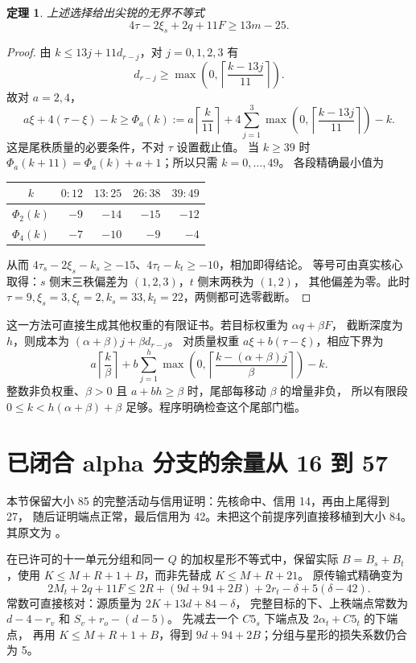 \documentclass[11pt,a4paper]{article}
\newtheorem{theorem}{定理}[section]
\begin{document}
\begin{theorem}\label{thm:weighted}
上述选择给出尖锐的无界不等式
\[\boxed{4\tau-2\xi_s+2q+11F\ge13m-25.}\]
\end{theorem}
\begin{proof}
由 $k\le13j+11d_{r-j}$，对 $j=0,1,2,3$ 有
\[d_{r-j}\ge\max\left(0,\left\lceil\frac{k-13j}{11}\right\rceil\right).
\]
故对 $a=2,4$，
\[
a\xi+4(\tau-\xi)-k\ge
\Phi_a(k):=a\left\lceil\frac{k}{11}\right\rceil+
4\sum_{j=1}^3\max\left(0,\left\lceil\frac{k-13j}{11}\right\rceil\right)-k.
\]
这是尾秩质量的必要条件，不对 $\tau$ 设置截止值。
当 $k\ge39$ 时 $\Phi_a(k+11)=\Phi_a(k)+a+1$；所以只需 $k=0,\ldots,49$。
各段精确最小值为
\begin{center}
\begin{tabular}{c|rrrr}
\toprule $k$&$0{:}12$&$13{:}25$&$26{:}38$&$39{:}49$\\\midrule
$\Phi_2(k)$&$-9$&$-14$&$-15$&$-12$\\
$\Phi_4(k)$&$-7$&$-10$&$-9$&$-4$\\\bottomrule
\end{tabular}
\end{center}
从而 $4\tau_s-2\xi_s-k_s\ge-15$、$4\tau_t-k_t\ge-10$，相加即得结论。
等号可由真实核心取得：$s$ 侧末三秩偏差为 $(1,2,3)$，$t$ 侧末两秩为 $(1,2)$，
其他偏差为零。此时 $\tau=9,\xi_s=3,\xi_t=2,k_s=33,k_t=22$，两侧都可选零截断。
\end{proof}

这一方法可直接生成其他权重的有限证书。若目标权重为 $\alpha q+\beta F$，
截断深度为 $h$，则成本为 $(\alpha+\beta)j+\beta d_{r-j}$。
对质量权重 $a\xi+b(\tau-\xi)$，相应下界为
\[
a\left\lceil\frac{k}{\beta}\right\rceil+
b\sum_{j=1}^h\max\left(0,\left\lceil\frac{k-(\alpha+\beta)j}{\beta}\right\rceil\right)-k.
\]
整数非负权重、$\beta>0$ 且 $a+bh\ge\beta$ 时，尾部每移动 $\beta$ 的增量非负，
所以有限段 $0\le k<h(\alpha+\beta)+\beta$ 足够。程序明确检查这个尾部门槛。

\section{已闭合 alpha 分支的余量从 16 到 57}\label{sec:alpha}
本节保留大小 85 的完整活动与信用证明：先核命中、信用 14，再由上尾得到 27，
随后证明端点正常，最后信用为 42。未把这个前提序列直接移植到大小 84。
其原文为 。

在已许可的十一单元分组和同一 $Q$ 的加权星形不等式中，保留实际
$B=B_s+B_t$，使用 $K\le M+R+1+B$，而非先替成 $K\le M+R+21$。
原传输式精确变为
\begin{equation}\label{eq:transport}
2M_t+2q+11F\le2R+(9d+94+2B)+2r_t-\delta+5(\delta-42).
\end{equation}
常数可直接核对：源质量为 $2K+13d+84-\delta$，
完整目标的下、上秩端点常数为 $d-4-r_v$ 和 $S_v+r_o-(d-5)$。
先减去一个 $C5_s$ 下端点及 $2\alpha_t+C5_t$ 的下端点，
再用 $K\le M+R+1+B$，得到 $9d+94+2B$；分组与星形的损失系数仍合为 5。
\end{document}
